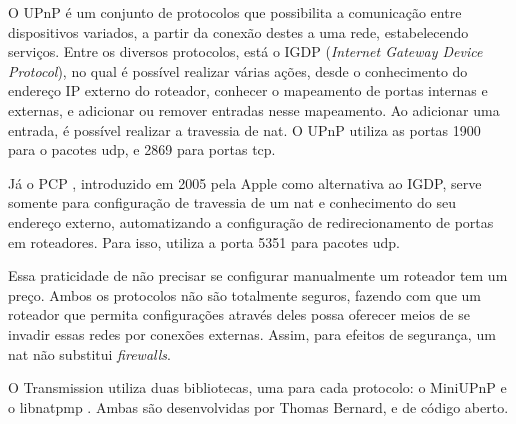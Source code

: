 O UPnP \cite{wiki:upnp} é um conjunto de protocolos que possibilita a comunicação entre
dispositivos variados, a partir da conexão destes a uma rede, estabelecendo serviços.
Entre os diversos protocolos, está o IGDP (\emph{Internet Gateway Device Protocol}), no
qual é possível realizar várias ações, desde o conhecimento do endereço IP externo do
roteador, conhecer o mapeamento de portas internas e externas, e adicionar ou remover
entradas nesse mapeamento. Ao adicionar uma entrada, é possível realizar a travessia de
\gls*{nat}. O UPnP utiliza as portas 1900 para o pacotes \gls*{udp}, e 2869 para portas
\gls*{tcp}.

Já o PCP \cite{wiki:pcp}, introduzido em 2005 pela Apple como alternativa ao IGDP,
serve somente para configuração de travessia de um \gls*{nat} e conhecimento do seu
endereço externo, automatizando a configuração de redirecionamento de portas em
roteadores. Para isso, utiliza a porta 5351 para pacotes \gls*{udp}.

Essa praticidade de não precisar se configurar manualmente um roteador tem um preço.
Ambos os protocolos não são totalmente seguros, fazendo com que um roteador que permita
configurações através deles possa oferecer meios de se invadir essas redes por conexões
externas. Assim, para efeitos de segurança, um \gls*{nat} não substitui \emph{firewalls}.

\newpage
O Transmission utiliza duas bibliotecas, uma para cada protocolo: o MiniUPnP
\cite{site:miniupnp} e o libnatpmp \cite{site:libnatpmp}. Ambas são desenvolvidas por
Thomas Bernard, e de código aberto.